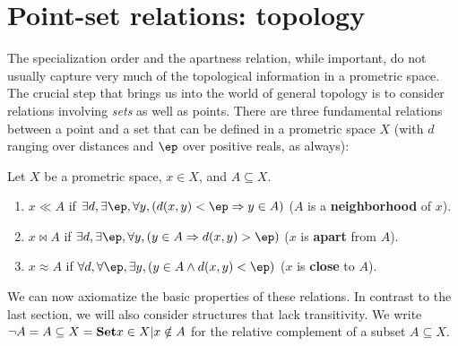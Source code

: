 \documentclass{article}
\def\oapt{\mathrel{\!\not\,\not\lesssim}}
\def\cpl#1{\neg #1}
\let\implies\Rightarrow
\begin{document}


\section{Point-set relations: topology}
\label{sec:point-set}
\label{sec:topology}

The specialization order and the apartness relation, while important, do not usually capture very much of the topological information in a prometric space.
The crucial step that brings us into the world of general topology is to consider relations involving \emph{sets} as well as points.
There are three fundamental relations between a point and a set that can be defined in a prometric space $X$ (with $d$ ranging over distances and $\ep$ over positive reals, as always):

\begin{defn}\label{defn:toprels}
  Let $X$ be a prometric space, $x\in X$, and $A\subseteq X$.
  \begin{enumerate}
  \item $x\ll A$ if $\exists d, \exists \ep, \forall y, (d(x,y)<\ep \implies y\in A)$ ($A$ is a \textbf{neighborhood} of $x$).
  \item $x\bowtie A$ if $\exists d, \exists \ep, \forall y, (y\in A \implies d(x,y)>\ep)$ ($x$ is \textbf{apart} from $A$).
  \item $x\approx A$ if $\forall d, \forall \ep, \exists y, (y\in A \land d(x,y)<\ep)$ ($x$ is \textbf{close} to $A$).
  \end{enumerate}
\end{defn}

We can now axiomatize the basic properties of these relations.
In contrast to the last section, we will also consider structures that lack transitivity.
We write $\cpl{A} = A\subseteq X = \setof{x\in X | x\notin A}$ for the relative complement of a subset $A\subseteq X$.
\end{document}
